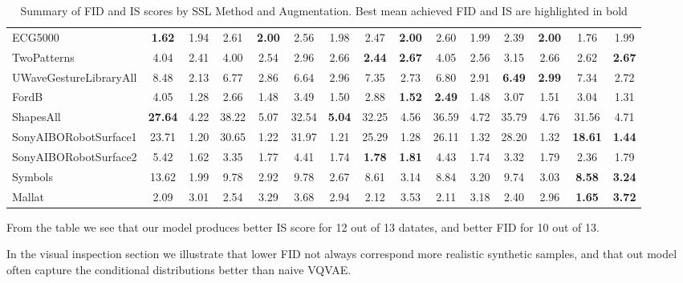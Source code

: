 \documentclass[../../thesis.tex]{subfiles}
\begin{document}
\begin{table}[H]
\begin{adjustbox}{width=\textwidth}
\begin{tabular}{lcc|cc|cc|cc|cc|cc|cc}
        ECG5000                 & \textbf{1.62} & 1.94 & 2.61 & \textbf{2.00} & 2.56 & 1.98 & 2.47 & \textbf{2.00} & 2.60 & 1.99 & 2.39 & \textbf{2.00} & 1.76 & 1.99 \\
        TwoPatterns             & 4.04 & 2.41 & 4.00 & 2.54 & 2.96 & 2.66 & \textbf{2.44} & \textbf{2.67} & 4.05 & 2.56 & 3.15 & 2.66 & 2.62 & \textbf{2.67} \\
        UWaveGestureLibraryAll  & 8.48 & 2.13 & 6.77 & 2.86 & 6.64 & 2.96 & 7.35 & 2.73 & 6.80 & 2.91 & \textbf{6.49} & \textbf{2.99} & 7.34 & 2.72 \\
        FordB                   & 4.05 & 1.28 & 2.66 & 1.48 & 3.49 & 1.50 & 2.88 & \textbf{1.52} & \textbf{2.49} & 1.48 & 3.07 & 1.51 & 3.04 & 1.31 \\
        ShapesAll               & \textbf{27.64} & 4.22 & 38.22 & 5.07 & 32.54 & \textbf{5.04} & 32.25 & 4.56 & 36.59 & 4.72 & 35.79 & 4.76 & 31.56 & 4.71 \\
        SonyAIBORobotSurface1   & 23.71 & 1.20 & 30.65 & 1.22 & 31.97 & 1.21 & 25.29 & 1.28 & 26.11 & 1.32 & 28.20 & 1.32 & \textbf{18.61} & \textbf{1.44} \\
        SonyAIBORobotSurface2   & 5.42 & 1.62 & 3.35 & 1.77 & 4.41 & 1.74 & \textbf{1.78} & \textbf{1.81} & 4.43 & 1.74 & 3.32 & 1.79 & 2.36 & 1.79 \\
        Symbols                 & 13.62 & 1.99 & 9.78 & 2.92 & 9.78 & 2.67 & 8.61 & 3.14 & 8.84 & 3.20 & 9.74 & 3.03 & \textbf{8.58} & \textbf{3.24} \\
        Mallat                  & 2.09 & 3.01 & 2.54 & 3.29 & 3.68 & 2.94 & 2.12 & 3.53 & 2.11 & 3.18 & 2.40 & 2.96 & \textbf{1.65} & \textbf{3.72} \\
        \bottomrule
    \end{tabular}
    \end{adjustbox}
    \caption{Summary of FID and IS scores by SSL Method and Augmentation. Best mean achieved FID and IS are highlighted in bold}
\end{table}

From the table we see that our model produces better IS score for 12 out of 13 datates, and better FID for 10 out of 13.\newline

In the visual inspection section we illustrate that lower FID not always correspond more realistic synthetic samples, and that out model often capture the conditional distributions better than naive VQVAE. 
\end{document}
